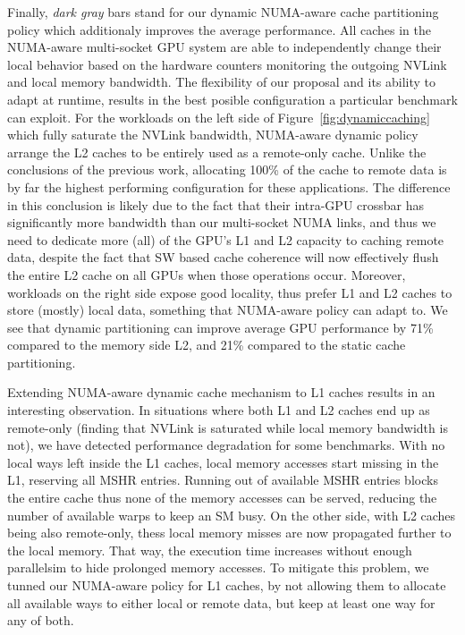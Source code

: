 Finally, \emph{dark gray} bars stand for our dynamic NUMA-aware cache partitioning policy which additionaly improves the average performance. All caches in the NUMA-aware multi-socket GPU system are able to independently change their local behavior based on the hardware counters monitoring the outgoing NVLink and local memory bandwidth. The flexibility of our proposal and its ability to adapt at runtime, results in the best posible configuration a particular benchmark can exploit. For the workloads on the left side of Figure~\ref{fig:dynamiccaching} which fully saturate the NVLink bandwidth, NUMA-aware dynamic policy arrange the L2 caches to be entirely used as a remote-only cache. Unlike the conclusions
of the previous work, allocating 100\% of the cache to remote data is by far the highest performing configuration for these applications.
The difference in this conclusion is likely due to the fact that their intra-GPU
crossbar has significantly more bandwidth than our multi-socket NUMA links, and thus
we need to dedicate more (all) of the GPU's L1 and L2 capacity to caching remote data, despite
the fact that SW based cache coherence will now effectively flush the entire L2 cache
on all GPUs when those operations occur. Moreover, workloads on the right side expose good locality, thus prefer L1 and L2 caches to store (mostly) local data, something that NUMA-aware policy can adapt to. We see that dynamic partitioning can improve average GPU performance by 71\% compared to the memory side L2, and 21\% compared to the static cache partitioning. 

Extending NUMA-aware dynamic cache mechanism to L1 caches results in an interesting observation. In situations where both L1 and L2 caches end up as remote-only (finding that NVLink is saturated while local memory bandwidth is not), we have detected performance degradation for some benchmarks. With no local ways left inside the L1 caches, local memory accesses start missing in the L1, reserving all MSHR entries. Running out of available MSHR entries blocks the entire cache thus none of the memory accesses can be served, reducing the number of available warps to keep an SM busy. On the other side, with L2 caches being also remote-only, thess local memory misses are now propagated further to the local memory. That way, the execution time increases without enough parallelsim to hide prolonged memory accesses. To mitigate this problem, we tunned our NUMA-aware policy for L1 caches, by not allowing them to allocate all available ways to either local or remote data, but keep at least one way for any of both. 


